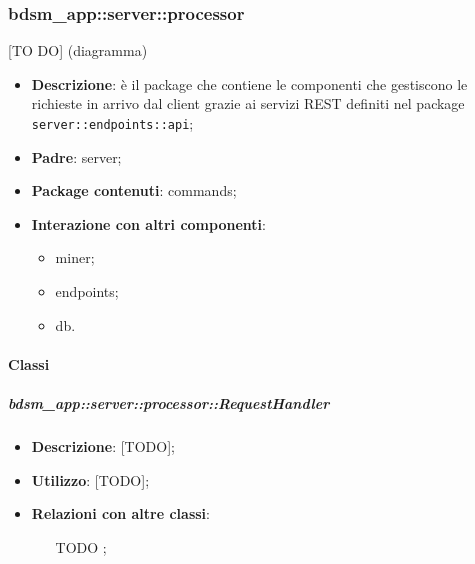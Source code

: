 


\subsubsection{bdsm\_app::server::processor} %
\label{ssub:bdsm_app_server_processor}
[TO DO] (diagramma) \newline \newline

\begin{itemize}
  \item \textbf{Descrizione}: è il package che contiene le componenti che gestiscono le richieste in arrivo dal client grazie ai servizi REST definiti nel package \texttt{server::endpoints::api};
  \item \textbf{Padre}: server;
  \item \textbf{Package contenuti}: commands;
  \item \textbf{Interazione con altri componenti}:
    \begin{itemize}
      \item miner;
      \item endpoints;
      \item db.
    \end{itemize}
\end{itemize}

  \paragraph{Classi} %

    \subparagraph{bdsm\_app::server::processor::RequestHandler} %
    \label{subp:bdsm_app_server_processor_requesthandler}
    \begin{itemize}
      \item \textbf{Descrizione}: [TODO];
      \item \textbf{Utilizzo}: [TODO];
      \item \textbf{Relazioni con altre classi}:
        \begin{itemize}
          \item [TODO];
        \end{itemize}
      \end{itemize}

